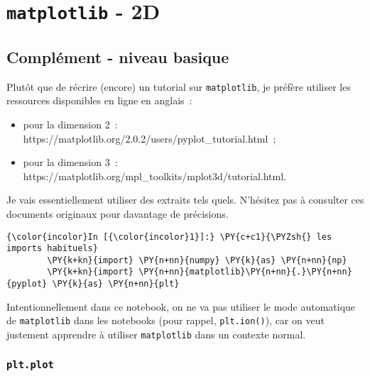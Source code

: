     
    
    
    

    

    \hypertarget{matplotlib---2d}{%
\section{\texorpdfstring{\texttt{matplotlib} -
2D}{matplotlib - 2D}}\label{matplotlib---2d}}

    \hypertarget{compluxe9ment---niveau-basique}{%
\subsection{Complément - niveau
basique}\label{compluxe9ment---niveau-basique}}

    Plutôt que de récrire (encore) un tutorial sur \texttt{matplotlib}, je
préfère utiliser les ressources disponibles en ligne en anglais~:

\begin{itemize}
\tightlist
\item
  pour la dimension 2~:
  https://matplotlib.org/2.0.2/users/pyplot\_tutorial.html~;
\item
  pour la dimension 3~:
  https://matplotlib.org/mpl\_toolkits/mplot3d/tutorial.html.
\end{itemize}

Je vais essentiellement utiliser des extraits tels quels. N'hésitez pas
à consulter ces documents originaux pour davantage de précisions.

    \begin{Verbatim}[commandchars=\\\{\}]
{\color{incolor}In [{\color{incolor}1}]:} \PY{c+c1}{\PYZsh{} les imports habituels}
        \PY{k+kn}{import} \PY{n+nn}{numpy} \PY{k}{as} \PY{n+nn}{np}
        \PY{k+kn}{import} \PY{n+nn}{matplotlib}\PY{n+nn}{.}\PY{n+nn}{pyplot} \PY{k}{as} \PY{n+nn}{plt}
\end{Verbatim}


    Intentionnellement dans ce notebook, on ne va pas utiliser le mode
automatique de \texttt{matplotlib} dans les notebooks (pour rappel,
\texttt{plt.ion()}), car on veut justement apprendre à utiliser
\texttt{matplotlib} dans un contexte normal.

    \hypertarget{plt.plot}{%
\subsubsection{\texorpdfstring{\texttt{plt.plot}}{plt.plot}}\label{plt.plot}}

